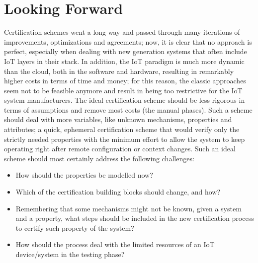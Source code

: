 


\section{Looking Forward}
Certification schemes went a long way and passed through many iterations of improvements, optimizations and agreements; now, it is clear that no approach is perfect, especially when dealing with new generation systems that often include IoT layers in their stack. In addition, the IoT paradigm is much more dynamic than the cloud, both in the software and hardware, resulting in remarkably higher costs in terms of time and money; for this reason, the classic approaches seem not to be feasible anymore and result in being too restrictive for the IoT system manufacturers. The ideal certification scheme should be less rigorous in terms of assumptions and remove most costs (the manual phases). Such a scheme should deal with more variables, like unknown mechanisms, properties and attributes; a quick, ephemeral certification scheme that would verify only the strictly needed properties with the minimum effort to allow the system to keep operating right after remote configuration or context changes. Such an ideal scheme should most certainly address the following challenges:
\begin{itemize}
    \item How should the properties be modelled now?
    \item Which of the certification building blocks should change, and how?
    \item Remembering that some mechanisms might not be known, given a system and a property, what steps should be included in the new certification process to certify such property of the system?
    \item How should the process deal with the limited resources of an IoT device/system in the testing phase?

\end{itemize}
